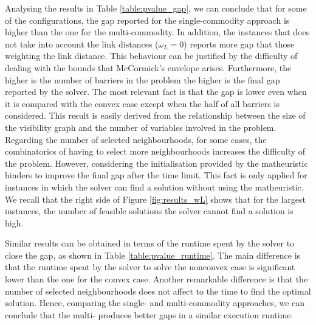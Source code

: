 \documentclass[a4paper,  review, authoryear, 1p.]{elsarticle}
\begin{document}
{		Analysing the results in Table \ref{table:pvalue_gap}, we can conclude that for some of the configurations, the gap reported for the single-commodity approach is higher than the one for the multi-commodity. In addition, the instances that does not take into account the link distances ($\omega_L=0$) reports more gap that those weighting the link distance. This behaviour can be justified by the difficulty of dealing with the bounds that McCormick's envelope arises. Furthermore, the higher is the number of barriers in the problem the higher is the final gap reported by the solver. The most relevant fact is that the gap is lower even when it is compared with the convex case except when the half of all barriers is considered. This result is easily derived from the relationship between the size of the visibility graph and the number of variables involved in the problem. Regarding the number of selected neighbourhoods, for some cases, the combinatorics of having to select more neighbourhoods increases the difficulty of the problem. However, considering the initialisation provided by the matheuristic hinders to improve the final gap after the time limit. This fact is only applied for instances in which the solver can find a solution without using the matheuristic. We recall that the right side of Figure \ref{fig:results_wL} shows that for the largest instances, the number of feasible solutions the solver cannot find a solution is high.
		
		Similar results can be obtained in terms of the runtime spent by the solver to close the gap, as shown in Table \ref{table:pvalue_runtime}. The main difference is that the runtime spent by the solver to solve the nonconvex case is significant lower than the one for the convex case. Another remarkable difference is that the number of selected neighbourhoods does not affect to the time to find the optimal solution. Hence, comparing the single- and multi-commodity approaches, we can conclude that the multi- produces better gaps in a similar execution runtime. }
		
		
			
		
\end{document}
